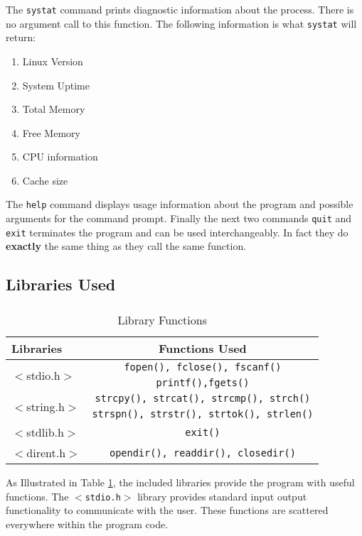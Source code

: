 \documentclass[10pt]{article}
\begin{document}
The \texttt{systat} command prints diagnostic information about the process. There is no argument call to this function. The following information is what \texttt{systat} will return:

\begin{enumerate}[noitemsep]
	\item Linux Version
	\item System Uptime
	\item Total Memory
	\item Free Memory
	\item CPU information
	\item Cache size
\end{enumerate}
\hfill

The \texttt{help} command displays usage information about the program and possible arguments for the command prompt. Finally the next two commands \texttt{quit} and \texttt{exit} terminates the program and can be used interchangeably. In fact they do \textbf{exactly} the same thing as they call the same function.
\newpage

\subsection{Libraries Used}
\subparagraph{}
\begin{table}[t]
\centering
\begin{tabular}{l|c}
	Libraries & Functions Used\\\hline\hline
	\multirow{2}{*}{$<$stdio.h$>$} 
		& \texttt{fopen(), fclose(), fscanf()}\\
	 & \texttt{printf(),fgets()}\\\hline
	\multirow{2}{*}{$<$string.h$>$}
	 & \texttt{strcpy(), strcat(), strcmp(), strch()}\\
		& \texttt{strspn(), strstr(), strtok(), strlen()}\\\hline
	$<$stdlib.h$>$ & \texttt{exit()}\\\hline
	$<$dirent.h$>$ & \texttt{opendir(), readdir(), closedir()}\\
\end{tabular}
\caption{Library Functions}
\label{table:libfuncs}
\end{table}

As Illustrated in Table \ref{table:libfuncs}, the included libraries provide the program with useful functions. The  \texttt{$<$stdio.h$>$} library provides standard input output functionality to communicate with the user. These functions are scattered everywhere within the program code.
\end{document}

